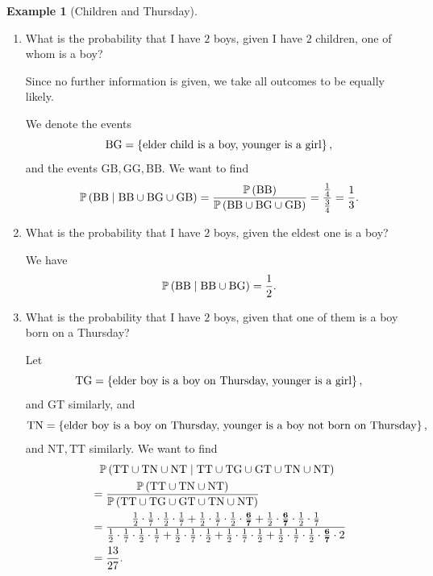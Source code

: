 \documentclass{article}
\theoremstyle{definition}
\newtheorem{example}[theorem]{Example}
\theoremstyle{remark}
\newcommand{\Prob}{\mathbb{P}}
\newcommand{\Conditional}[2]{#1\mid #2}
\begin{document}
\begin{example}[Children and Thursday]
    \label{ex:children-thursday}%
    \begin{enumerate}
        \item What is the probability that I have \(2\) boys, given I have \(2\) children, one of whom is a boy?
    
            Since no further information is given, we take all outcomes to be equally likely.

            We denote the events
            \[
                \mathrm{BG} = \left\{\text{elder child is a boy, younger is a girl}\right\},
            \]
            and the events \(\mathrm{GB}, \mathrm{GG}, \mathrm{BB}\). We want to find
            \[
                \Prob\pqty{\Conditional{\mathrm{BB}}{\mathrm{BB} \cup \mathrm{BG} \cup \mathrm{GB}}} = \frac{\Prob\pqty{\mathrm{BB}}}{\Prob\pqty{\mathrm{BB} \cup \mathrm{BG} \cup \mathrm{GB}}} = \frac{\frac{1}{4}}{\frac{3}{4}} = \frac{1}{3}.
            \]

        \item What is the probability that I have \(2\) boys, given the eldest one is a boy?
        
            We have
            \[
                \Prob\pqty{\Conditional{\mathrm{BB}}{\mathrm{BB}} \cup \mathrm{BG}} = \frac{1}{2}.
            \]

        \item What is the probability that I have \(2\) boys, given that one of them is a boy born on a Thursday?
        
        Let
        \[
            \mathrm{TG} = \left\{\text{elder boy is a boy on Thursday, younger is a girl}\right\},
        \]
        and \(\mathrm{GT}\) similarly, and
        \[
            \mathrm{TN} = \left\{\text{elder boy is a boy on Thursday, younger is a boy not born on Thursday}\right\},
        \]
        and \(\mathrm{NT, TT}\) similarly. We want to find
        \begin{align*}
            &\phantom{=} \Prob\pqty{\Conditional{\mathrm{TT} \cup \mathrm{TN} \cup \mathrm{NT}}{\mathrm{TT} \cup \mathrm{TG} \cup \mathrm{GT} \cup \mathrm{TN} \cup \mathrm{NT}}} \\
            &= \frac{\Prob\pqty{\mathrm{TT} \cup \mathrm{TN} \cup \mathrm{NT}}}{\Prob\pqty{\mathrm{TT} \cup \mathrm{TG} \cup \mathrm{GT} \cup \mathrm{TN} \cup \mathrm{NT}}} \\
            &= \frac{\frac{1}{2} \cdot \frac{1}{7} \cdot \frac{1}{2} \cdot \frac{1}{7} + \frac{1}{2} \cdot \frac{1}{7} \cdot \frac{1}{2} \cdot \mathbf{\frac{6}{7}} + \frac{1}{2} \cdot \mathbf{\frac{6}{7}} \cdot \frac{1}{2} \cdot \frac{1}{7}}{\frac{1}{2} \cdot \frac{1}{7} \cdot \frac{1}{2} \cdot \frac{1}{7} + \frac{1}{2} \cdot \frac{1}{7} \cdot \frac{1}{2} + \frac{1}{2} \cdot \frac{1}{7} \cdot \frac{1}{2} + \frac{1}{2} \cdot \frac{1}{7} \cdot \frac{1}{2} \cdot \mathbf{\frac{6}{7}} \cdot 2}
 \\
            &= \frac{13}{27}.
        \end{align*}
    \end{enumerate}
\end{example}
\end{document}
